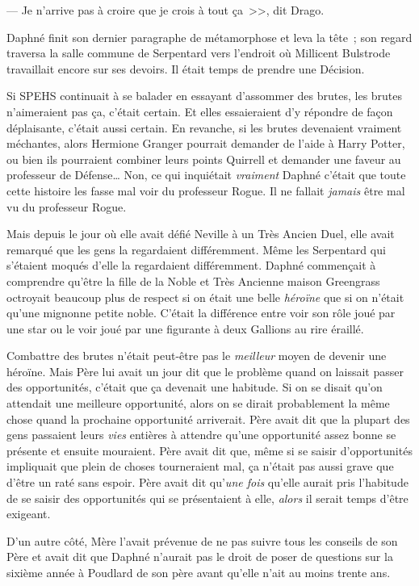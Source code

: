 --- Je n'arrive pas à croire que je crois à tout ça~>>, dit Drago.

\later

Daphné finit son dernier paragraphe de métamorphose et leva la tête~; son regard traversa la salle commune de Serpentard vers l'endroit où Millicent Bulstrode travaillait encore sur ses devoirs. Il était temps de prendre une Décision.

Si SPEHS continuait à se balader en essayant d'assommer des brutes, les brutes n'aimeraient pas ça, c'était certain. Et elles essaieraient d'y répondre de façon déplaisante, c'était aussi certain. En revanche, si les brutes devenaient vraiment méchantes, alors Hermione Granger pourrait demander de l'aide à Harry Potter, ou bien ils pourraient combiner leurs points Quirrell et demander une faveur au professeur de Défense… Non, ce qui inquiétait \emph{vraiment} Daphné c'était que toute cette histoire les fasse mal voir du professeur Rogue. Il ne fallait \emph{jamais} être mal vu du professeur Rogue.

Mais depuis le jour où elle avait défié Neville à un Très Ancien Duel, elle avait remarqué que les gens la regardaient différemment. Même les Serpentard qui s'étaient moqués d'elle la regardaient différemment. Daphné commençait à comprendre qu'être la fille de la Noble et Très Ancienne maison Greengrass octroyait beaucoup plus de respect si on était une belle \emph{héroïne} que si on n'était qu'une mignonne petite noble. C'était la différence entre voir son rôle joué par une star ou le voir joué par une figurante à deux Gallions au rire éraillé.

Combattre des brutes n'était peut-être pas le \emph{meilleur} moyen de devenir une héroïne. Mais Père lui avait un jour dit que le problème quand on laissait passer des opportunités, c'était que ça devenait une habitude. Si on se disait qu'on attendait une meilleure opportunité, alors on se dirait probablement la même chose quand la prochaine opportunité arriverait. Père avait dit que la plupart des gens passaient leurs \emph{vies} entières à attendre qu'une opportunité assez bonne se présente et ensuite mouraient. Père avait dit que, même si se saisir d'opportunités impliquait que plein de choses tourneraient mal, ça n'était pas aussi grave que d'être un raté sans espoir. Père avait dit qu'\emph{une fois} qu'elle aurait pris l'habitude de se saisir des opportunités qui se présentaient à elle, \emph{alors} il serait temps d'être exigeant.

D'un autre côté, Mère l'avait prévenue de ne pas suivre tous les conseils de son Père et avait dit que Daphné n'aurait pas le droit de poser de questions sur la sixième année à Poudlard de son père avant qu'elle n'ait au moins trente ans.

